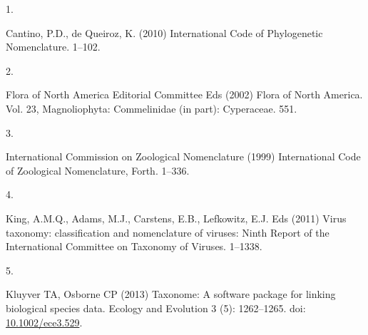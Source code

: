 \documentclass[
]{article}
\newlength{\cslhangindent}
\newlength{\csllabelwidth}
\newlength{\cslentryspacingunit} %
\newenvironment{CSLReferences}[2] %
 {%
  \setlength{\parindent}{0pt}
  \ifodd #1
  \let\oldpar\par
  \def\par{\hangindent=\cslhangindent\oldpar}
  \fi
  \setlength{\parskip}{#2\cslentryspacingunit}
 }%
 {}
\newcommand{\CSLLeftMargin}[1]{\parbox[t]{\csllabelwidth}{#1}}
\newcommand{\CSLRightInline}[1]{\parbox[t]{\linewidth - \csllabelwidth}{#1}\break}
\begin{document}
\hypertarget{refs}{}
\begin{CSLReferences}{0}{0}
\leavevmode{}%
\CSLLeftMargin{1. }
\CSLRightInline{Cantino, P.D., de Queiroz, K. (2010) {International Code
of Phylogenetic Nomenclature}. 1--102.}

\leavevmode{}%
\CSLLeftMargin{2. }
\CSLRightInline{Flora of North America Editorial Committee Eds (2002)
{Flora of North America. Vol. 23, Magnoliophyta: Commelinidae (in part):
Cyperaceae}. 551.}

\leavevmode{}%
\CSLLeftMargin{3. }
\CSLRightInline{International Commission on Zoological Nomenclature
(1999) {International Code of Zoological Nomenclature}, Forth. 1--336.}

\leavevmode{}%
\CSLLeftMargin{4. }
\CSLRightInline{King, A.M.Q., Adams, M.J., Carstens, E.B., Lefkowitz,
E.J. Eds (2011) {Virus taxonomy: classification and nomenclature of
viruses: Ninth Report of the International Committee on Taxonomy of
Viruses.} 1--1338.}

\leavevmode{}%
\CSLLeftMargin{5. }
\CSLRightInline{Kluyver TA, Osborne CP (2013) Taxonome: A software
package for linking biological species data. Ecology and Evolution 3
(5): 1262--1265. doi:
\href{https://doi.org/10.1002/ece3.529}{10.1002/ece3.529}.}

\end{CSLReferences}
\end{document}
